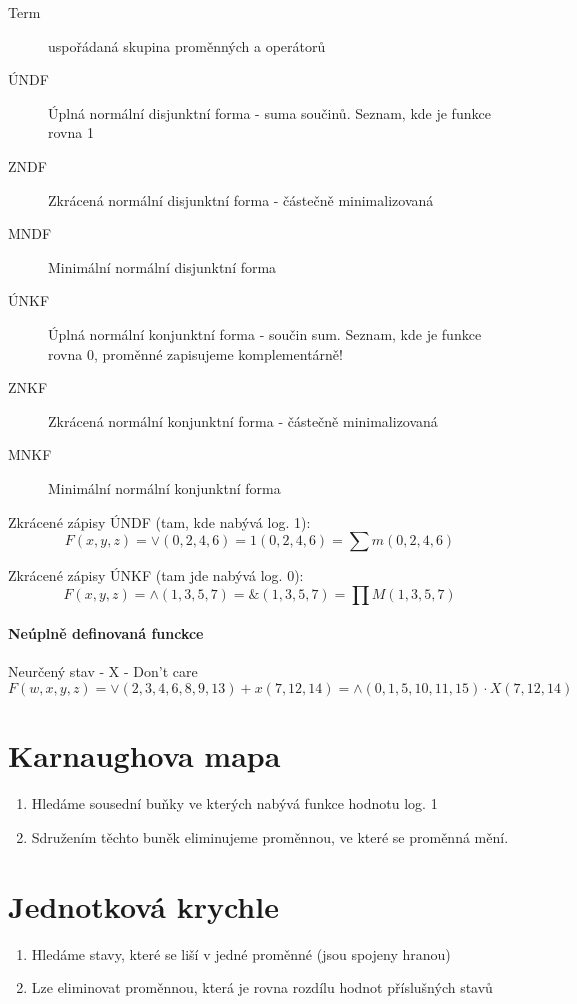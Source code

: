 \documentclass[a4paper, 11pt]{report}
\begin{document}
\begin{description}
	\item[Term] uspořádaná skupina proměnných a operátorů
	\item[ÚNDF] Úplná normální disjunktní forma - suma součinů. Seznam, kde je funkce rovna 1
	\item[ZNDF] Zkrácená normální disjunktní forma - částečně minimalizovaná
	\item[MNDF] Minimální normální disjunktní forma
	\item[ÚNKF] Úplná normální konjunktní forma - součin sum. Seznam, kde je funkce rovna 0, proměnné zapisujeme komplementárně!
	\item[ZNKF] Zkrácená normální konjunktní forma - částečně minimalizovaná
	\item[MNKF] Minimální normální konjunktní forma
\end{description}

Zkrácené zápisy ÚNDF (tam, kde nabývá log. 1):
$$ F(x,y,z) = \lor(0,2,4,6) = 1(0,2,4,6) = \sum{}m(0,2,4,6)$$

Zkrácené zápisy ÚNKF (tam jde nabývá log. 0):
$$ F(x,y,z) = \land(1,3,5,7) = \&(1,3,5,7) = \prod{}M(1,3,5,7)$$

\paragraph{Neúplně definovaná funckce}
Neurčený stav - X - Don't care
$$ F(w,x,y,z) = \lor(2,3,4,6,8,9,13) + x(7,12,14) = \land(0,1,5,10,11,15) \cdot X(7,12,14)$$


\section{Karnaughova mapa}

\begin{enumerate}
	\item Hledáme sousední buňky ve kterých nabývá funkce hodnotu log. 1
	\item Sdružením těchto buněk eliminujeme proměnnou, ve které se proměnná mění.
\end{enumerate}

\section{Jednotková krychle}

\begin{enumerate}
	\item Hledáme stavy, které se liší v jedné proměnné (jsou spojeny hranou)
	\item Lze eliminovat proměnnou, která je rovna rozdílu hodnot příslušných stavů
\end{enumerate}
\end{document}
